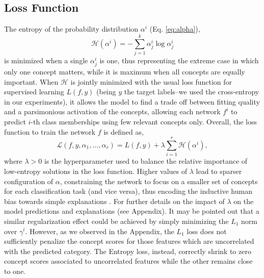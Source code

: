 \documentclass[withindex,glossary]{cam-thesis}
\theoremstyle{plain}
\theoremstyle{definition}
\theoremstyle{remark}
\begin{document}
\subsection{Loss Function}
The entropy of the probability distribution $\alpha^i$ (Eq. \ref{eq:alpha}),
\begin{equation}
    \mathcal{H}(\alpha^i) = - \sum_{j=1}^k \alpha^i_j \log \alpha^i_j
    \label{eq:ent}
\end{equation}
is minimized when a single $\alpha^i_j$ is one, thus representing the extreme case in which only one concept matters, while it is maximum when all concepts are equally important. When $\mathcal{H}$ is jointly minimized with the usual loss function for supervised learning $L(f,y)$ (being $y$ the target labels--we used the cross-entropy in our experiments), it allows the model to find a trade off between fitting quality and a parsimonious activation of the concepts, 
allowing each network $f^i$ to predict $i$-th class memberships using few relevant concepts only.
Overall, the loss function to train the network $f$ is defined as,
\begin{equation}
    \mathcal{L}(f,y,\alpha_1,\ldots,\alpha_r) = L(f,y) + \lambda \sum_{i=1}^r\mathcal{H}(\alpha^i),
    \label{eq:loss}
\end{equation}
where $\lambda > 0$ is the hyperparameter used to balance the relative importance of low-entropy solutions in the loss function. Higher values of $\lambda$ lead to sparser configuration of $\alpha$, constraining the network to focus on a smaller set of concepts for each classification task (and vice versa), thus encoding the inductive human bias towards simple explanations \citep{miller1956magical,cowan2001magical,ma2014changing}. For further details on the impact of $\lambda$ on the model predictions and explanations (see Appendix).
It may be pointed out that a similar regularization effect could be achieved by simply minimizing the $L_1$ norm over $\gamma^i$. However, as we observed in the Appendix, the $L_1$ loss does not sufficiently penalize the concept scores for those features which are uncorrelated with the predicted category. The Entropy loss, instead, correctly shrink to zero concept scores associated to uncorrelated features while the other remains close to one.
\end{document}
